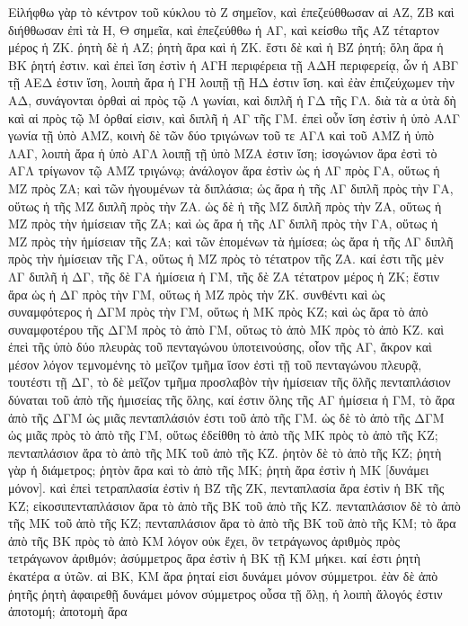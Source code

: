 \begin{Parallel}{}{}
{{\greekfont Εἰλήφθω γὰρ τὸ κέντρον τοῦ κύκλου τὸ Ζ σημεῖον, καὶ
ἐπεζεύθθωσαν αἱ ΑΖ, ΖΒ καὶ διήθθωσαν ἐπὶ τὰ Η, Θ σημεῖα,
καὶ ἐπεζεύθθω ἡ ΑΓ, καὶ κείσθω τῆς ΑΖ τέταρτον μέρος
ἡ ΖΚ. ῥητὴ δὲ ἡ ΑΖ; ῥητὴ ἄρα καὶ ἡ ΖΚ. ἔστι
δὲ καὶ ἡ ΒΖ ῥητή; ὅλη ἄρα ἡ ΒΚ ῥητή ἐστιν. καὶ ἐπεὶ
ἴση ἐστὶν ἡ ΑΓΗ περιφέρεια τῇ ΑΔΗ περιφερείᾳ, ὧν ἡ ΑΒΓ τῇ
ΑΕΔ ἐστιν ἴση, λοιπὴ ἄρα ἡ ΓΗ λοιπῇ τῇ ΗΔ ἐστιν ἴση.
καὶ ἐὰν ἐπιζεύχωμεν τὴν ΑΔ, συνάγονται ὀρθαὶ αἱ πρὸς τῷ
Λ γωνίαι, καὶ διπλῆ ἡ ΓΔ τῆς ΓΛ. διὰ τὰ α ὐτὰ δὴ καὶ αἱ
πρὸς τῷ Μ ὀρθαί εἰσιν, καὶ διπλῆ ἡ ΑΓ τῆς ΓΜ. ἐπεὶ
οὖν ἴση ἐστὶν ἡ ὑπὸ ΑΛΓ γωνία τῇ ὑπὸ ΑΜΖ, κοινὴ δὲ
τῶν δύο τριγώνων τοῦ τε ΑΓΛ καὶ τοῦ ΑΜΖ ἡ ὑπὸ ΛΑΓ,
λοιπὴ ἄρα ἡ ὑπὸ ΑΓΛ λοιπῇ τῇ ὑπὸ ΜΖΑ ἐστιν ἴση;
ἰσογώνιον ἄρα ἐστὶ τὸ ΑΓΛ τρίγωνον τῷ ΑΜΖ τριγώνῳ;
ἀνάλογον ἄρα ἐστὶν ὡς ἡ ΛΓ πρὸς ΓΑ, οὕτως ἡ 
ΜΖ πρὸς ΖΑ; καὶ τῶν ἡγουμένων τὰ διπλάσια; ὡς ἄρα
ἡ τῆς ΛΓ διπλῆ πρὸς τὴν ΓΑ, οὕτως ἡ τῆς ΜΖ
διπλῆ πρὸς τὴν ΖΑ. ὡς δὲ ἡ τῆς ΜΖ διπλῆ πρὸς τὴν ΖΑ,
οὕτως ἡ ΜΖ πρὸς τὴν ἡμίσειαν τῆς ΖΑ; καὶ ὡς ἄρα
ἡ τῆς ΛΓ διπλῆ πρὸς τὴν ΓΑ, οὕτως ἡ ΜΖ πρὸς τὴν
ἡμίσειαν τῆς ΖΑ; καὶ 
τῶν ἑπομένων τὰ ἡμίσεα; ὡς ἄρα ἡ τῆς ΛΓ διπλῆ πρὸς τὴν
ἡμίσειαν τῆς ΓΑ,  οὕτως ἡ ΜΖ πρὸς τὸ τέτατρον τῆς ΖΑ. καί
ἐστι τῆς μὲν ΛΓ διπλῆ ἡ ΔΓ, τῆς δὲ ΓΑ ἡμίσεια ἡ ΓΜ,
τῆς δὲ ΖΑ τέτατρον μέρος ἡ ΖΚ; ἔστιν ἄρα ὡς ἡ ΔΓ πρὸς
τὴν ΓΜ, οὕτως ἡ ΜΖ πρὸς τὴν ΖΚ. συνθέντι καὶ ὡς συναμφότερος
ἡ ΔΓΜ πρὸς τὴν ΓΜ, οὕτως ἡ ΜΚ πρὸς ΚΖ; καὶ ὡς ἄρα
τὸ ἀπὸ συναμφοτέρου τῆς ΔΓΜ πρὸς τὸ ἀπὸ ΓΜ, οὕτως τὸ
ἀπὸ ΜΚ πρὸς τὸ ἀπὸ ΚΖ. καὶ ἐπεὶ τῆς ὑπὸ δύο
πλευρὰς τοῦ πενταγώνου ὑποτεινούσης, οἷον τῆς ΑΓ, ἄκρον
καὶ μέσον λόγον τεμνομένης τὸ μεῖζον τμῆμα ἴσον ἐστὶ
τῇ τοῦ πενταγώνου πλευρᾷ, τουτέστι τῇ ΔΓ, τὸ δὲ μεῖζον
τμῆμα προσλαβὸν τὴν ἡμίσειαν τῆς ὅλῆς πενταπλάσιον
δύναται τοῦ ἀπὸ τῆς ἡμισείας τῆς ὅλης, καί ἐστιν ὅλης τῆς
ΑΓ ἡμίσεια ἡ ΓΜ, τὸ ἄρα ἀπὸ τῆς ΔΓΜ ὡς μιᾶς
πενταπλάσιόν ἐστι τοῦ ἀπὸ τῆς ΓΜ. ὡς δὲ τὸ ἀπὸ τῆς
ΔΓΜ ὡς μιᾶς πρὸς τὸ ἀπὸ τῆς ΓΜ, οὕτως ἐδείθθη τὸ
ἀπὸ τῆς ΜΚ πρὸς τὸ ἀπὸ τῆς ΚΖ; πενταπλάσιον ἄρα τὸ ἀπὸ
τῆς ΜΚ τοῦ ἀπὸ τῆς ΚΖ. ῥητὸν δὲ τὸ ἀπὸ τῆς ΚΖ;
ῥητὴ γὰρ ἡ  διάμετρος; ῥητὸν ἄρα καὶ τὸ ἀπὸ τῆς ΜΚ;
ῥητὴ ἄρα  ἐστὶν ἡ ΜΚ [δυνάμει μόνον]. καὶ ἐπεὶ
τετραπλασία ἐστὶν ἡ ΒΖ τῆς ΖΚ, πενταπλασία ἄρα ἐστὶν
ἡ ΒΚ τῆς  ΚΖ;
εἰκοσιπενταπλάσιον ἄρα τὸ ἀπὸ τῆς ΒΚ τοῦ ἀπὸ τῆς ΚΖ.
πενταπλάσιον δὲ τὸ ἀπὸ τῆς ΜΚ τοῦ ἀπὸ τῆς ΚΖ; πενταπλάσιον
ἄρα τὸ ἀπὸ τῆς ΒΚ τοῦ ἀπὸ τῆς ΚΜ; τὸ ἄρα ἀπὸ τῆς
ΒΚ πρὸς τὸ ἀπὸ ΚΜ λόγον οὐκ ἔχει, ὃν τετράγωνος ἀριθμὸς
πρὸς τετράγωνον ἀριθμόν; ἀσύμμετρος ἄρα ἐστὶν ἡ ΒΚ τῇ ΚΜ
μήκει. καί ἐστι ῥητὴ ἑκατέρα α ὐτῶν. αἱ ΒΚ, ΚΜ ἄρα
ῥηταί εἰσι δυνάμει μόνον σύμμετροι. ἐὰν δὲ ἀπὸ ῥητῆς
ῥητὴ ἀφαιρεθῇ δυνάμει μόνον σύμμετρος οὖσα τῇ
ὅλῃ, ἡ λοιπὴ ἄλογός ἐστιν ἀποτομή; ἀποτομὴ ἄρα
}}
\end{Parallel}
